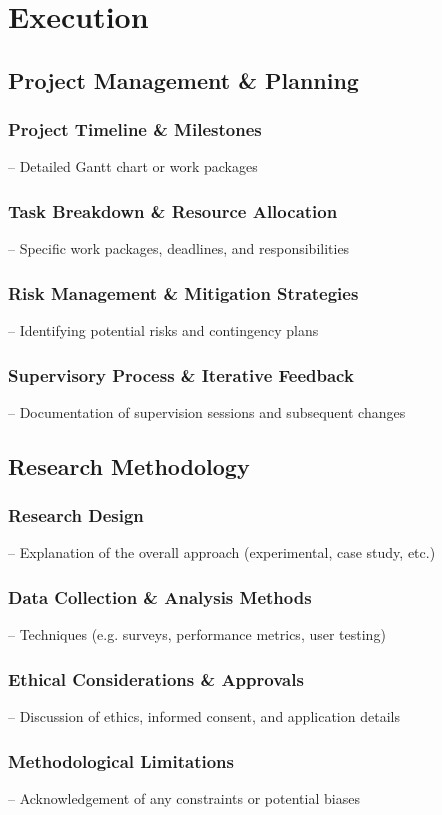 \section{Execution}

\subsection{Project Management \& Planning}
\subsubsection{Project Timeline \& Milestones}
– Detailed Gantt chart or work packages
\subsubsection{Task Breakdown \& Resource Allocation}
– Specific work packages, deadlines, and responsibilities
\subsubsection{Risk Management \& Mitigation Strategies}
– Identifying potential risks and contingency plans
\subsubsection{Supervisory Process \& Iterative Feedback}
– Documentation of supervision sessions and subsequent changes
\subsection{Research Methodology}
\subsubsection{Research Design}
– Explanation of the overall approach (experimental, case study, etc.)
\subsubsection{Data Collection \& Analysis Methods}
– Techniques (e.g. surveys, performance metrics, user testing)
\subsubsection{Ethical Considerations \& Approvals}
– Discussion of ethics, informed consent, and application details
\subsubsection{Methodological Limitations}
– Acknowledgement of any constraints or potential biases
